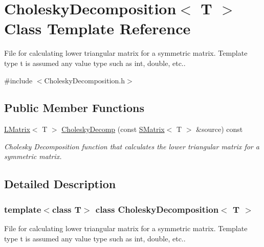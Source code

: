 \hypertarget{class_cholesky_decomposition}{}\section{Cholesky\+Decomposition$<$ T $>$ Class Template Reference}
\label{class_cholesky_decomposition}


File for calculating lower triangular matrix for a symmetric matrix. Template type t is assumed any value type such as int, double, etc..  




{\ttfamily \#include $<$Cholesky\+Decomposition.\+h$>$}

\subsection*{Public Member Functions}
\begin{DoxyCompactItemize}
\item 
\mbox{\hyperlink{class_l_matrix}{L\+Matrix}}$<$ T $>$ \mbox{\hyperlink{class_cholesky_decomposition_a2e61ad86b4d08faac1c7b3268ba77c9d}{Cholesky\+Decomp}} (const \mbox{\hyperlink{class_s_matrix}{S\+Matrix}}$<$ T $>$ \&source) const
\begin{DoxyCompactList}\small\item\em Cholesky Decomposition function that calculates the lower triangular matrix for a symmetric matrix. \end{DoxyCompactList}\end{DoxyCompactItemize}


\subsection{Detailed Description}
\subsubsection*{template$<$class T$>$\newline
class Cholesky\+Decomposition$<$ T $>$}

File for calculating lower triangular matrix for a symmetric matrix. Template type t is assumed any value type such as int, double, etc.. 

